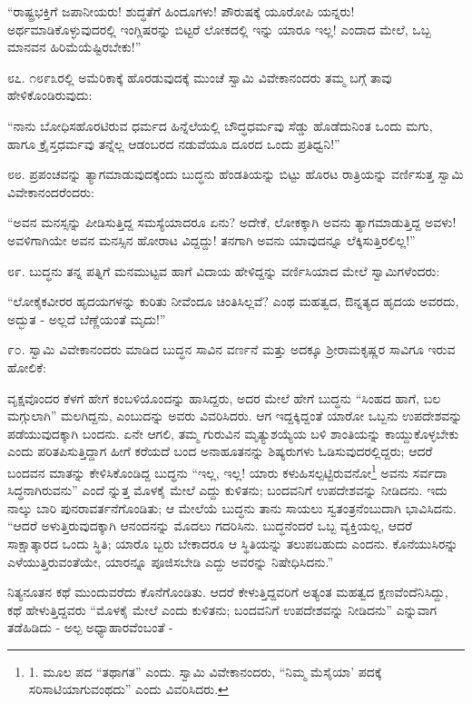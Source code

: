 “ರಾಷ್ಟ್ರಭಕ್ತಿಗೆ ಜಪಾನೀಯರು! ಶುದ್ಧತೆಗೆ ಹಿಂದೂಗಳು! ಪೌರುಷಕ್ಕೆ ಯೂರೋಪಿ ಯನ್ನರು! ಅರ್ಥಮಾಡಿಕೊಳ್ಳುವುದರಲ್ಲಿ ಇಂಗ್ಲಿಷರನ್ನು ಬಿಟ್ಟರೆ ಲೋಕದಲ್ಲಿ ಇನ್ನು ಯಾರೂ ಇಲ್ಲ! ಎಂದಾದ ಮೇಲೆ, ಒಬ್ಬ ಮಾನವನ ಹಿರಿಮೆಯೆಷ್ಟಿರಬೇಕು!” 

೮೭. ೧೮೯೩ರಲ್ಲಿ ಅಮೆರಿಕಾಕ್ಕೆ ಹೊರಡುವುದಕ್ಕೆ ಮುಂಚೆ ಸ್ವಾಮಿ ವಿವೇಕಾನಂದರು ತಮ್ಮ ಬಗ್ಗೆ ತಾವು ಹೇಳಿಕೊಂಡಿರುವುದು:

“ನಾನು ಬೋಧಿಸಹೊರಟಿರುವ ಧರ್ಮದ ಹಿನ್ನೆಲೆಯಲ್ಲಿ ಬೌದ್ಧಧರ್ಮವು ಸೆಡ್ಡು ಹೊಡೆದುನಿಂತ ಒಂದು ಮಗು, ಹಾಗೂ ಕ್ರೈಸ್ತಧರ್ಮವು ತನ್ನೆಲ್ಲ ಆಡಂಬರದ ನಡುವೆಯೂ ದೂರದ ಒಂದು ಪ್ರತಿಧ್ವನಿ!” 

೮೮. ಪ್ರಪಂಚವನ್ನು ತ್ಯಾಗಮಾಡುವುದಕ್ಕೆಂದು ಬುದ್ಧನು ಹೆಂಡತಿಯನ್ನು ಬಿಟ್ಟು ಹೊರಟ ರಾತ್ರಿಯನ್ನು ವರ್ಣಿಸುತ್ತ ಸ್ವಾಮಿ ವಿವೇಕಾನಂದರೆಂದರು:

“ಅವನ ಮನಸ್ಸನ್ನು ಪೀಡಿಸುತ್ತಿದ್ದ ಸಮಸ್ಯೆಯಾದರೂ ಏನು? ಅದೇಕೆ, ಲೋಕಕ್ಕಾಗಿ ಅವನು ತ್ಯಾಗಮಾಡುತ್ತಿದ್ದ ಅವಳು! ಅವಳಿಗಾಗಿಯೇ ಅವನ ಮನಸ್ಸಿನ ಹೋರಾಟ ವಿದ್ದದ್ದು! ತನಗಾಗಿ ಅವನು ಯಾವುದನ್ನೂ ಲೆಕ್ಕಿಸುತ್ತಿರಲಿಲ್ಲ!” 

೮೯. ಬುದ್ಧನು ತನ್ನ ಪತ್ನಿಗೆ ಮನಮುಟ್ಟವ ಹಾಗೆ ವಿದಾಯ ಹೇಳಿದ್ದನ್ನು ವರ್ಣಿಸಿಯಾದ ಮೇಲೆ ಸ್ವಾಮಿಗಳೆಂದರು:

“ಲೋಕೈಕವೀರರ ಹೃದಯಗಳನ್ನು ಕುರಿತು ನೀವೆಂದೂ ಚಿಂತಿಸಿಲ್ಲವೆ? ಎಂಥ ಮಹತ್ವದ, ಔನ್ನತ್ಯದ ಹೃದಯ ಅವರದು, ಅದ್ಭುತ - ಅಲ್ಲದೆ ಬೆಣ್ಣೆಯಂತೆ ಮೃದು!” 

೯೦. ಸ್ವಾಮಿ ವಿವೇಕಾನಂದರು ಮಾಡಿದ ಬುದ್ಧನ ಸಾವಿನ ವರ್ಣನೆ ಮತ್ತು ಅದಕ್ಕೂ ಶ‍್ರೀರಾಮಕೃಷ್ಣರ ಸಾವಿಗೂ ಇರುವ ಹೋಲಿಕೆ:

ವೃಕ್ಷವೊಂದರ ಕೆಳಗೆ ಹೇಗೆ ಕಂಬಳಿಯೊಂದನ್ನು ಹಾಸಿದ್ದರು, ಅದರ ಮೇಲೆ ಹೇಗೆ ಬುದ್ಧನು “ಸಿಂಹದ ಹಾಗೆ, ಬಲ ಮಗ್ಗುಲಾಗಿ” ಮಲಗಿದ್ದನು, ಎಂಬುದನ್ನು ಅವರು ವಿವರಿಸಿದರು. ಆಗ ಇದ್ದಕ್ಕಿದ್ದಂತೆ ಯಾರೋ ಒಬ್ಬನು ಉಪದೇಶವನ್ನು ಪಡೆಯುವುದಕ್ಕಾಗಿ ಬಂದನು. ಏನೇ ಆಗಲಿ, ತಮ್ಮ ಗುರುವಿನ ಮೃತ್ಯುಶಯ್ಯೆಯ ಬಳಿ ಶಾಂತಿಯನ್ನು ಕಾಯ್ದುಕೊಳ್ಳಬೇಕು ಎಂದು ಪರಿತಪಿಸುತ್ತಿದ್ದಾಗ ಹೀಗೆ ಕರೆಯದೆ ಬಂದ ಅನಾಹೂತನನ್ನು ಶಿಷ್ಯರುಗಳು ಓಡಿಸುವುದರಲ್ಲಿದ್ದರು; ಆದರೆ ಬಂದವನ ಮಾತನ್ನು ಕೇಳಿಸಿಕೊಂಡಿದ್ದ ಬುದ್ಧನು “ಇಲ್ಲ, ಇಲ್ಲ! ಯಾರು ಕಳುಹಿಸಲ್ಪಟ್ಟಿರುವನೋ\footnote{1. ಮೂಲ ಪದ “ತಥಾಗತ” ಎಂದು. ಸ್ವಾಮಿ ವಿವೇಕಾನಂದರು, “ನಿಮ್ಮ ಮೆಸೈಯಾ’  ಪದಕ್ಕೆ ಸರಿಸಾಟಿಯಾಗುವಂಥದು” ಎಂದು ವಿವರಿಸಿದರು.} ಅವನು ಸರ್ವದಾ ಸಿದ್ಧನಾಗಿರುವನು” ಎಂದೆ ನ್ನುತ್ತ ಮೊಳಕೈ ಮೇಲೆ ಎದ್ದು ಕುಳಿತನು; ಬಂದವನಿಗೆ ಉಪದೇಶವನ್ನು ನೀಡಿದನು. ಇದು ನಾಲ್ಕು ಬಾರಿ ಪುನರಾವರ್ತನೆಗೊಂಡಿತು; ಆ ಮೇಲೆಯೆ ಬುದ್ಧನು ತಾನು ಸಾಯಲು ಸ್ವತಂತ್ರನೆಂಬುದಾಗಿ ಭಾವಿಸಿದನು. “ಆದರೆ ಅಳುತ್ತಿರುವುದಕ್ಕಾಗಿ ಆನಂದನನ್ನು ಮೊದಲು ಗದರಿಸಿನು. ಬುದ್ಧನೆಂದರೆ ಒಬ್ಬ ವ್ಯಕ್ತಿಯಲ್ಲ, ಆದರೆ ಸಾಕ್ಷಾತ್ಕಾರದ ಒಂದು ಸ್ಥಿತಿ; ಯಾರೊ ಬ್ಬರು ಬೇಕಾದರೂ ಆ ಸ್ಥಿತಿಯನ್ನು ತಲುಪಬಹುದು ಎಂದನು. ಕೊನೆಯುಸಿರನ್ನು ಎಳೆಯುತ್ತಿರುವಂತೆಯೇ, ಯಾರನ್ನೂ ಪೂಜಿಸಬೇಡಿ ಎದ್ದು ಅವರನ್ನು ನಿಷೇಧಿಸಿದನು.”

ನಿತ್ಯನೂತನ ಕಥೆ ಮುಂದುವರೆದು ಕೊನೆಗೊಂಡಿತು. ಆದರೆ ಕೇಳುತ್ತಿದ್ದವರಿಗೆ ಅತ್ಯಂತ ಮಹತ್ವದ ಕ್ಷಣವೆಂದೆನಿಸಿದ್ದು, ಕಥೆ ಹೇಳುತ್ತಿದ್ದವರು “ಮೊಳಕೈ ಮೇಲೆ ಎಂದು ಕುಳಿತನು; ಬಂದವನಿಗೆ ಉಪದೇಶವನ್ನು ನೀಡಿದನು” ಎನ್ನುವಾಗ ತಡೆಹಿಡಿದು - ಅಲ್ಪ ಅಧ್ಯಾಹಾರವೆಂಬಂತೆ -

